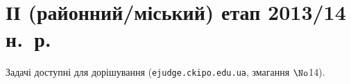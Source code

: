 
\section{ІІ (районний/міський) етап 2013/14 н.~р.}

Задачі доступні для дорішування (\verb"ejudge.ckipo.edu.ua", змагання $\No$14).

\renewenvironment{problemAllDefault}[1]{\vspace{10mm}\par\begin{problem}{#1}{Клавіатура (stdin)}{Екран (stdout)}{1 сек}{64 мегабайти}}{\end{problem}}

	

	

	

	


